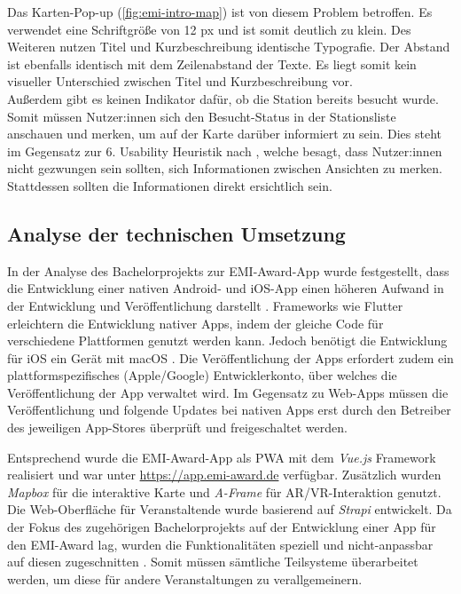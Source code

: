 Das Karten-Pop-up (\autoref{fig:emi-intro-map}) ist von diesem Problem
betroffen. Es verwendet eine Schriftgröße von 12 px und ist somit deutlich zu
klein. Des Weiteren nutzen Titel und Kurzbeschreibung identische Typografie. Der
Abstand ist ebenfalls identisch mit dem Zeilenabstand der Texte. Es liegt somit
kein visueller Unterschied zwischen Titel und Kurzbeschreibung vor. \\
Außerdem gibt es keinen Indikator dafür, ob die Station bereits besucht wurde.
Somit müssen Nutzer:innen sich den Besucht-Status in der Stationsliste anschauen
und merken, um auf der Karte darüber informiert zu sein. Dies steht im Gegensatz
zur 6. Usability Heuristik nach \textcite{Nielsen1994}, welche besagt, dass
Nutzer:innen nicht gezwungen sein sollten, sich Informationen zwischen Ansichten
zu merken. Stattdessen sollten die Informationen direkt ersichtlich sein.


\subsection{Analyse der technischen Umsetzung} \label{ssec:analysis-old-tech}

In der Analyse des Bachelorprojekts zur EMI-Award-App wurde festgestellt, dass
die Entwicklung einer nativen Android- und iOS-App einen höheren Aufwand in der
Entwicklung und Veröffentlichung darstellt \cite{Canzler2021}. Frameworks wie
Flutter \cite{Google2022} erleichtern die Entwicklung nativer Apps, indem der
gleiche Code für verschiedene Plattformen genutzt werden kann. Jedoch benötigt
die Entwicklung für iOS ein Gerät mit macOS \cite{Apple2022}. Die
Veröffentlichung der Apps erfordert zudem ein plattformspezifisches
(Apple/Google) Entwicklerkonto, über welches die Veröffentlichung der App
verwaltet wird. Im Gegensatz zu Web-Apps müssen die Veröffentlichung und
folgende Updates bei nativen Apps erst durch den Betreiber des jeweiligen
App-Stores überprüft und freigeschaltet werden.

Entsprechend wurde die EMI-Award-App als \ac{PWA} mit dem \textit{Vue.js}
\cite{You2022a} Framework realisiert und war unter \url{https://app.emi-award.de}
verfügbar. Zusätzlich wurden \textit{Mapbox} \cite{Mapbox2022} für die
interaktive Karte und \textit{A-Frame} \cite{Supermedium2021} für
\ac{AR}/\ac{VR}-Interaktion genutzt. Die Web-Oberfläche für Veranstaltende wurde basierend
auf \textit{Strapi} \cite{Strapi2022} entwickelt. Da der Fokus des zugehörigen
Bachelorprojekts auf der Entwicklung einer App für den EMI-Award lag, wurden die
Funktionalitäten speziell und nicht-anpassbar auf diesen zugeschnitten \cite{Canzler2021}. Somit
müssen sämtliche Teilsysteme überarbeitet werden, um diese für andere
Veranstaltungen zu verallgemeinern.


